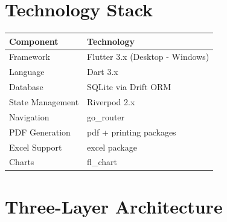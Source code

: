 \documentclass[12pt,a4paper]{report}
\begin{document}
\section{Technology Stack}

\begin{longtable}{@{}p{4cm}p{9cm}@{}}
\toprule
\textbf{Component} & \textbf{Technology} \\
\midrule
\endhead
Framework & Flutter 3.x (Desktop - Windows) \\
Language & Dart 3.x \\
Database & SQLite via Drift ORM \\
State Management & Riverpod 2.x \\
Navigation & go\_router \\
PDF Generation & pdf + printing packages \\
Excel Support & excel package \\
Charts & fl\_chart \\
\bottomrule
\end{longtable}

\section{Three-Layer Architecture}
\end{document}
